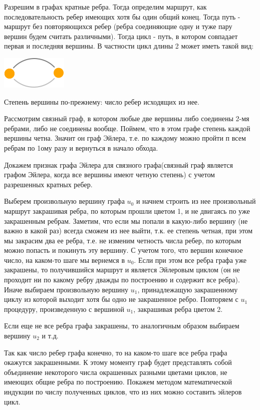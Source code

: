 \documentclass{article}
\begin{document}
Разрешим в графах кратные ребра. Тогда определим маршрут, как последовательность ребер имеющих хотя бы один общий конец. Тогда путь - маршрут без повторяющихся ребер (ребра соединяющие одну и туже пару вершин будем считать различными). Тогда цикл - путь, в котором совпадает первая и последняя вершины. В частности цикл длины 2 может иметь такой вид:
\\
\begin{center}
	\includegraphics[scale=0.6]{6_1}
\end{center}

Степень вершины по-прежнему: число ребер исходящих из нее.

Рассмотрим связный граф, в котором любые две вершины либо соединены 2-мя ребрами, либо не соединены вообще. Поймем, что в этом графе степень каждой вершины четна. Значит он граф Эйлера, т.е. по каждому можно пройти п всем ребрам по 1ому разу и вернуться в начало обхода.

Докажем признак графа Эйлера для связного графа(связный граф является графом Эйлера, когда все вершины имеют четную степень) с учетом разрешенных кратных ребер.

Выберем произвольную вершину графа $u_0$ и начнем строить из нее произвольный маршрут закрашивая ребра, по которым прошли цветом 1, и не двигаясь по уже закрашенным ребрам.
Заметим, что если мы попали в какую-либо вершину (не важно в какой раз) всегда сможем из нее выйти, т.к. ее степень четная, при этом мы закрасим два ее ребра, т.е. не изменим четность числа ребер, по которым можно попасть и покинуть эту вершину. С учетом того, что вершин конечное число,  на каком-то шаге мы вернемся в $u_0$. Если при этом все ребра графа уже закрашены, то получившийся маршрут и является Эйлеровым циклом (он не проходит ни по какому ребру дважды по построению и содержит все ребра). Иначе выбираем произвольную вершину $u_1$, принадлежащую закрашенному циклу из которой выходит хотя бы одно не закрашенное ребро. Повторяем с $u_1$  процедуру, произведенную с вершиной $u_1$, закрашивая ребра цветом 2.

Если еще не все ребра графа закрашены, то аналогичным образом выбираем вершину $u_2$ и т.д.

Так как число ребер графа конечно, то на каком-то шаге все ребра графа окажутся закрашенными. К этому моменту граф будет представлять собой объединение некоторого числа окрашенных разными цветами циклов, не имеющих общие ребра по построению.
Покажем методом математической индукции по числу полученных  циклов, что из них можно составить эйлеров цикл.
\end{document}
